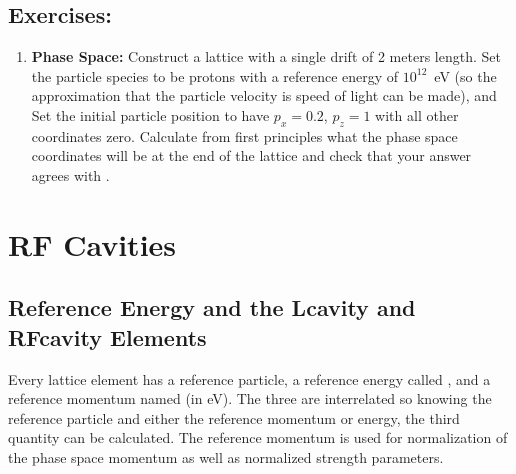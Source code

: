 \documentclass{hitec}     %
\begin{document}
{%

\subsection{Exercises:}

\begin{enumerate}[leftmargin=*]
\item {\bf Phase Space:} Construct a lattice with a single drift of 2 meters length.
Set the particle species to be protons with a reference energy of $10^12$~eV (so the approximation
that the particle velocity is speed of light can be made), and
Set the initial particle position to have $p_x = 0.2$, $p_z = 1$ with all other coordinates
zero. Calculate from first principles what the phase space coordinates will be at the end of the
lattice and check that your answer agrees with \bmad.
\end{enumerate}

\newpage

\section{RF Cavities}
\label{s:rf}

\subsection{Reference Energy and the Lcavity and RFcavity Elements}
\label{s:ref.energy}


\begin{description}[labelindent=-17pt,leftmargin=0pt]
\item[Reference Energy] \Newline
Every lattice element has a reference particle, a reference energy called , and a
reference momentum named  (in eV). The three are interrelated so knowing the reference
particle and either the reference momentum or energy, the third quantity can be calculated. The
reference momentum is used for normalization of the phase space momentum
as well as normalized strength parameters. 


\end{description}}
\end{document}
